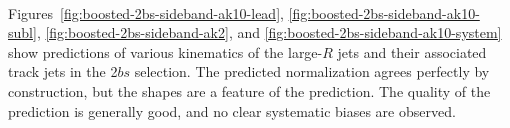 \paragraph{}
Figures~\ref{fig:boosted-2bs-sideband-ak10-lead}, \ref{fig:boosted-2bs-sideband-ak10-subl}, \ref{fig:boosted-2bs-sideband-ak2},  and \ref{fig:boosted-2bs-sideband-ak10-system} show predictions of various kinematics of the large-$R$ jets and their associated track jets in the 2$bs$ selection. The predicted normalization agrees perfectly by construction, but the shapes are a feature of the prediction. The quality of the prediction is generally good, and no clear systematic biases are observed.


